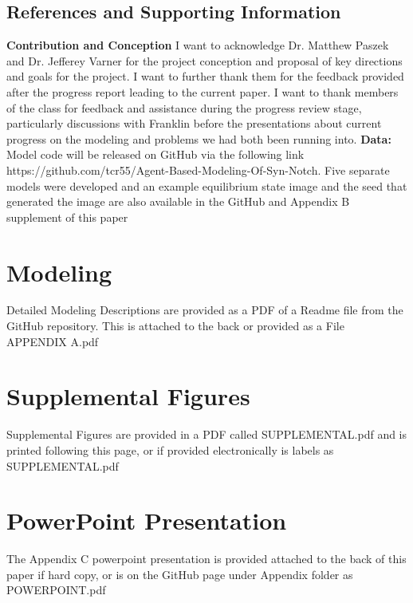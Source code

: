 \documentclass[12pt]{ifacconf}
\begin{document}
\subsection{References and Supporting Information}


\begin{ack}

\textbf{Contribution and Conception} I want to acknowledge Dr. Matthew Paszek and Dr. Jefferey Varner for the project conception and proposal of key directions and goals for the project. I want to further thank them for the feedback provided after the progress report leading to the current paper. I want to thank members of the class for feedback and assistance during the progress review stage, particularly discussions with Franklin before the presentations about current progress on the modeling and problems we had both been running into. \textbf{Data:} Model code will be released on GitHub via the following link https://github.com/tcr55/Agent-Based-Modeling-Of-Syn-Notch. Five separate models were developed and an example equilibrium state image and the seed that generated the image are also available in the GitHub and Appendix B supplement of this paper

\end{ack}






\appendix
\section{Modeling} %

Detailed Modeling Descriptions are provided as a PDF of a Readme file from the GitHub repository. This is attached to the back or provided as a File APPENDIX A.pdf
\section{Supplemental Figures } %

Supplemental Figures are provided in a PDF called SUPPLEMENTAL.pdf and is printed following this page, or if provided electronically is labels as SUPPLEMENTAL.pdf
\section{PowerPoint Presentation}
The Appendix C powerpoint presentation is provided attached to the back of this paper if hard copy, or is on the GitHub page under Appendix folder as POWERPOINT.pdf
\end{document}
